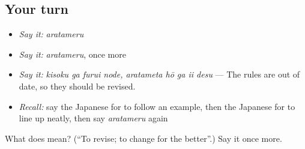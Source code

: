 \subsection*{Your turn}
\begin{itemize}
\raggedright
  \item \emph{Say it:} \emph{aratameru}
  \item \emph{Say it:} \emph{aratameru}, once more
  \item \emph{Say it:} \emph{kisoku ga furui node, aratameta hō ga ii desu} — The rules are out of date, so they should be revised.
  \item \emph{Recall:} say the Japanese for to follow an example, then the Japanese for to line up neatly, then say \emph{aratameru} again
\end{itemize}

\begin{tcolorbox}[breakable,colback=teal!4,colframe=teal!35!black,title={Before you move on}]
What does  mean? (\textquotedblleft{}To revise; to change for the better\textquotedblright{}.) Say it once more.
\end{tcolorbox}
